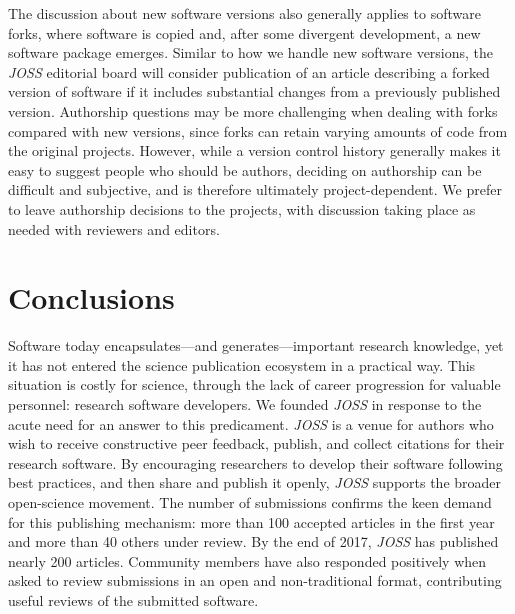 \documentclass{article}
\newcommand\joss{\textit{JOSS}}
\begin{document}
The discussion about new software versions also generally applies to software forks, where software is copied and, after some divergent development, a new software package emerges.
Similar to how we handle new software versions, the \joss{} editorial board will consider publication of an article describing a forked version of software if it includes substantial changes from a previously published version.
Authorship questions may be more challenging when dealing with forks compared with new versions, since forks can retain varying amounts of code from the original projects.
However, while a version control history generally makes it easy to suggest people who should be authors, deciding on authorship can be difficult and subjective, and is therefore ultimately project-dependent.
We prefer to leave authorship decisions to the projects, with discussion taking place as needed with reviewers and editors.


\section{Conclusions}
\label{conclusions}

Software today encapsulates---and generates---important research knowledge, yet
it has not entered the science publication ecosystem in a practical way.
This situation is costly for science, through the lack of career progression for
valuable personnel: research software developers.
We founded \joss{} in response to the acute need for an answer to this predicament.
\joss{} is a venue for authors who wish to receive constructive peer feedback,
publish, and collect citations for their research software.
By encouraging researchers to develop their software following best practices, and then share and publish it openly, \joss{} supports the broader open-science movement.
The number of submissions confirms the keen demand for this publishing mechanism:
more than 100 accepted articles in the first year and more than 40 others under review.
By the end of 2017, \joss{} has published nearly 200 articles.
Community members have also responded positively when asked to review submissions
in an open and non-traditional format, contributing useful reviews of the submitted software.
\end{document}
